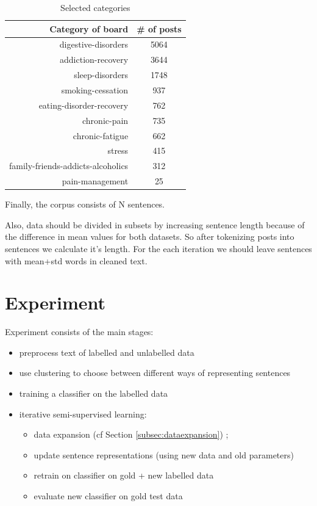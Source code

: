\documentclass[11pt]{article}
\begin{document}

\begin{table}[htb]
\centering
\begin{tabular}{ |r|c| }
\hline
Category of board &  \# of posts \\ \hline
digestive-disorders & 5064 \\ \hline
addiction-recovery & 3644 \\ \hline
sleep-disorders & 1748 \\ \hline
smoking-cessation & 937 \\ \hline
eating-disorder-recovery & 762 \\ \hline
chronic-pain & 735 \\ \hline
chronic-fatigue & 662 \\ \hline
stress & 415 \\ \hline
family-friends-addicts-alcoholics & 312 \\ \hline
pain-management & 25 \\ \hline
\end{tabular}
\caption{Selected categories}\label{cat_freq}
\end{table}
\FloatBarrier

Finally, the corpus consists of N  sentences. 

Also, data should be divided in subsets by increasing sentence length because of the difference in mean values for both datasets. So after tokenizing posts into sentences we calculate it's length. For the each iteration we should leave sentences with mean+std words in cleaned text.


\section{Experiment}

Experiment consists of the main stages:

\begin{itemize}
\item preprocess text of labelled and unlabelled data
\item use clustering to choose between different ways of representing sentences
\item training a classifier on the labelled data
\item iterative semi-supervised learning:
  \begin{itemize}
  \item data expansion (cf Section \ref{subsec:dataexpansion}) ; 
  \item update sentence representations (using new data and old parameters)
  \item retrain on classifier on gold + new labelled data
  \item evaluate new classifier on gold test data
\end{itemize}
\end{itemize}
\end{document}

